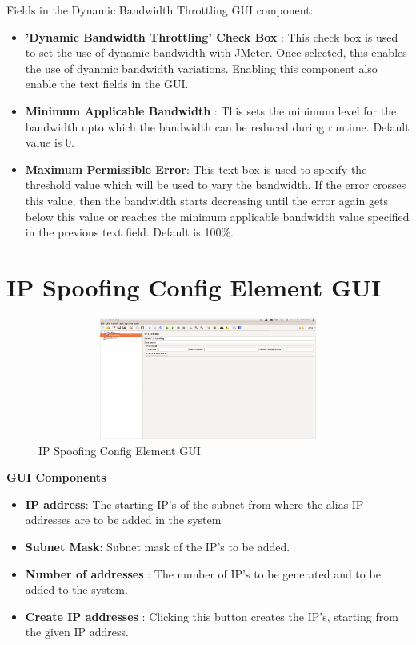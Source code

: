 \documentclass[12pt]{book}
\begin{document}
Fields in the Dynamic Bandwidth Throttling GUI component:
  \begin{itemize}
   \item \textbf{'Dynamic Bandwidth Throttling' Check Box} : This check box is used to set the use of dynamic bandwidth with JMeter. Once selected, 
   this enables the use of dyanmic bandwidth variations. Enabling this component also enable the text fields in the GUI.
   \item \textbf{Minimum Applicable Bandwidth} : This sets the minimum level for the bandwidth upto which the bandwidth can be reduced during runtime. 
   Default value is 0.
   \item \textbf{Maximum Permissible Error}: This text box is used to specify the threshold value which will be used to vary the bandwidth. If the error crosses this value, 
      then the bandwidth starts decreasing until the error again gets below this value or reaches the minimum applicable bandwidth value specified in the previous 
      text field. Default is 100\%.
  \end{itemize}
  
\section{IP Spoofing Config Element GUI}

  \begin{figure}[H]
   \centering
   \includegraphics[width=14cm, height=4cm]{images/ip_71}
   \caption{IP Spoofing Config Element GUI\label{fig:fig83_JMeter}}
  \end{figure}
  
  \textbf{GUI Components}
  \begin{itemize}
   \item \textbf{IP address}: The starting IP’s of the subnet from where the alias IP addresses are to be added in the system
   \item \textbf{Subnet Mask}: Subnet mask of the IP’s to be added.
   \item \textbf{Number of addresses} : The number of IP’s to be generated and to be added to the system.
   \item \textbf{Create IP addresses} : Clicking this button creates the IP’s, starting from the given IP address.
  \end{itemize}
\end{document}
